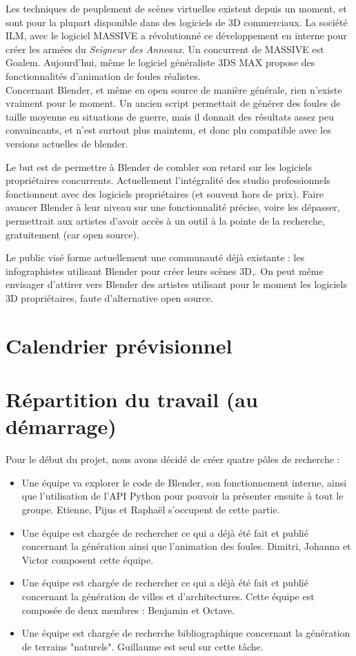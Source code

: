 \documentclass[a4paper,12pt]{article}
\begin{document}
Les techniques de peuplement de scènes virtuelles existent depuis un moment, et sont pour la plupart disponible dans des logiciels de 3D commerciaux. La société ILM, avec le logiciel MASSIVE\cite{Massive} a révolutionné ce développement en interne pour créer les armées du \textit{Seigneur des Anneaux}. Un concurrent de MASSIVE est Goalem\cite{Golaem}. Aujourd'hui, même le logiciel généraliste 3DS MAX\cite{3dsmax} propose des fonctionnalités d'animation de foules réalistes. \\
Concernant Blender, et même en  open source de manière générale, rien n'existe vraiment pour le moment. Un ancien script permettait de générer des foules de taille moyenne en situations de guerre, mais il donnait des résultats assez peu convaincants, et n'est surtout plus maintenu, et donc plu compatible avec les versions actuelles de blender.

Le but est de permettre à Blender de combler son retard sur les logiciels propriétaires concurrents. Actuellement l'intégralité des studio professionnels fonctionnent avec des logiciels propriétaires (et souvent hors de prix). Faire avancer Blender à leur niveau sur une fonctionnalité précise, voire les dépasser, permettrait aux artistes d'avoir accès à un outil à la pointe de la recherche, gratuitement (car open source).

Le public visé forme actuellement une communauté déjà existante : les infographistes utilisant Blender pour créer leurs scènes 3D,. On peut même envisager d'attirer vers Blender des artistes utilisant pour le moment les logiciels 3D propriétaires, faute d'alternative open source.

\section{Calendrier prévisionnel}

\section{Répartition du travail (au démarrage)}

Pour le début du projet, nous avons décidé de créer quatre pôles de recherche :
\begin{itemize}
\item Une équipe va explorer le code de Blender, son fonctionnement interne, ainsi que l'utilisation de l'API Python pour pouvoir la présenter ensuite à tout le groupe. Etienne, Pijus et Raphaël s'occupent de cette partie. 
\item Une équipe est chargée de rechercher ce qui a déjà été fait et publié concernant la génération ainsi que l'animation des foules. Dimitri, Johanna et Victor composent cette équipe.
\item Une équipe est chargée de rechercher ce qui a déjà été fait et publié concernant la génération de villes et d'architectures. Cette équipe est composée de deux membres : Benjamin et Octave.
\item Une équipe est chargée de recherche bibliographique concernant la génération de terrains "naturels". Guillaume est seul sur cette tâche.
\end{itemize}
\end{document}

